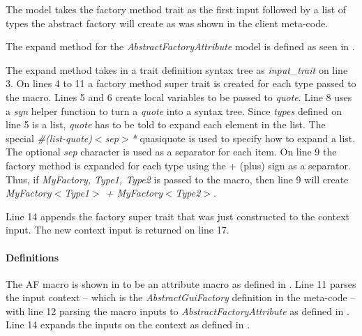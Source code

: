 
The model takes the factory method trait as the first input followed by a list of types the abstract factory will create as was shown in the client meta-code.

The expand method for the \textit{AbstractFactoryAttribute} model is defined as seen in .


The expand method takes in a trait definition syntax tree as \textit{input\_trait} on line 3.
On lines 4 to 11 a factory method super trait is created for each type passed to the macro.
Lines 5 and 6 create local variables to be passed to \textit{quote}.
Line 8 uses a \textit{syn} helper function to turn a \textit{quote} into a syntax tree.
Since \textit{types} defined on line 5 is a list, \textit{quote} has to be told to expand each element in the list.
The special \textit{\#(list-quote)$<$sep$>$*} quasiquote is used to specify how to expand a list.
The optional \textit{sep} character is used as a separator for each item.
On line 9 the factory method is expanded for each type using the + (plus) sign as a separator.
Thus, if \textit{MyFactory, Type1, Type2} is passed to the macro, then line 9 will create \textit{MyFactory$<$Type1$>$ + MyFactory$<$Type2$>$}.

Line 14 appends the factory super trait that was just constructed to the context input.
The new context input is returned on line 17.

\paragraph{Definitions}
The AF macro is shown in  to be an attribute macro as defined in .
Line 11 parses the input context -- which is the \textit{AbstractGuiFactory} definition in the meta-code -- with line 12 parsing the macro inputs to \textit{AbstractFactoryAttribute} as defined in .
Line 14 expands the inputs on the context as defined in .


